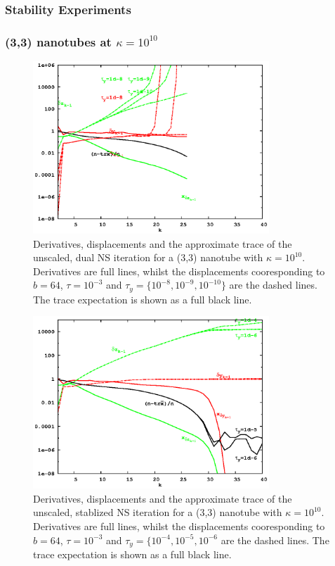 \documentclass[letterpaper,twocolumn,amsmath,amsfont,amssymb,english,aps,jcp,preprintnumbers,groupaddress,nofootinbib,tightenlines]{revtex4}
\begin{document}
\pagebreak

\subsubsection{Stability Experiments}

\subsubsection{(3,3) nanotubes at $\kappa=10^{10}$}


\begin{figure}[h]
\includegraphics[width=3.5in]{fig_33_tube_cond_10_noscaling/33_nanotube_cond10_noscale_dual.eps}
\caption{Derivatives, displacements and the approximate trace of the unscaled, dual NS iteration for a (3,3) nanotube with $\kappa =10^{10}$.
Derivatives are full lines, whilst the displacements cooresponding to $b=64$, $\tau=10^{-3}$ and $\tau_y=\{10^{-8}, 10^{-9}, 10^{-10}\}$
are the dashed lines.  The trace expectation is shown as a full black line. }
\end{figure}


\begin{figure}[h]
\includegraphics[width=3.5in]{fig_33_tube_cond_10_noscaling/33_nanotube_cond10_noscale_stab.eps}
\caption{Derivatives, displacements and the approximate trace of the unscaled, stablized NS iteration for a (3,3)
nanotube with $\kappa =10^{10}$.
Derivatives are full lines, whilst the displacements cooresponding to $b=64$, $\tau=10^{-3}$ and
$\tau_y=\{10^{-4}, 10^{-5}, 10^{-6}$  are the dashed lines.  The trace expectation is shown as a full black line. }
\end{figure}
\end{document}
